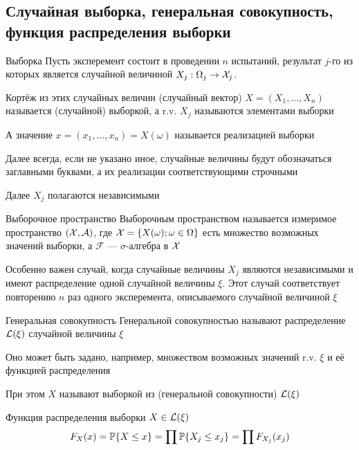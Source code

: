 \subsection{Случайная выборка, генеральная совокупность, функция распределения выборки}

\begin{dfn}{Выборка}
Пусть эксперемент состоит в проведении $n$ испытаний,
результат $j$-го из которых
является случайной величиной $X_j: \Omega_j\to\mathcal X_j$.

Кортёж из этих случайных величин (случайный вектор)
$X = (X_1, \dotsc, X_n)$ называется (случайной) выборкой,
а r.v. $X_j$ называются элементами выборки

А значение $x = (x_1, \dotsc, x_n) = X(\omega)$ называется реализацией выборки

Далее всегда, если не указано иное,
случайные величины будут обозначаться заглавными буквами,
а их реализации соответствующими строчными

Далее $X_j$ полагаются независимыми
\end{dfn}

\begin{dfn}{Выборочное пространство}
Выборочным пространством
называется измеримое пространство
$(\mathcal X, \mathcal A)$,
где $\mathcal X = \{X(\omega) ; \omega\in\Omega\}$
есть множество возможных значений выборки,
а $\mathcal F$ --- $\sigma$-алгебра в $\mathcal X$
\end{dfn}

Особенно важен случай, когда случайные величины $X_j$
являются независимыми и
имеют распределение одной случайной величины $\xi$.
Этот случай соответствует повторению $n$ раз одного эксперемента,
описываемого случайной величиной $\xi$

\begin{dfn}{Генеральная совокупность}
Генеральной совокупностью
называют распределение $\mathcal L(\xi)$ случайной величины $\xi$

Оно может быть задано, например, множеством возможных значений r.v. $\xi$
и её функцией распределения

При этом $X$ называют выборкой из (генеральной совокупности) $\mathcal L(\xi)$
\end{dfn}

\begin{dfn}{Функция распределения выборки}
 $X\in\mathcal L(\xi)$
$$F_X(x) = \mathbb P\{X\leq x\} = \prod\mathbb P\{X_j\leq x_j\} = \prod F_{X_j}(x_j)$$
\end{dfn}
